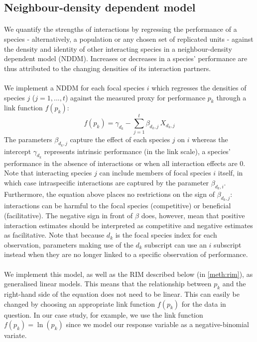 \documentclass[a4,12pt]{article}
\begin{document}
    \subsection{Neighbour-density dependent model}
    \label{meth:nddm}    

        \paragraph{}
        We quantify the strengths of interactions by regressing the performance of a species  - alternatively, a population or any chosen set of replicated units - against the density and identity of other interacting species in a neighbour-density dependent model (NDDM).  Increases or decreases in a species' performance are thus attributed to the changing densities of its interaction partners. 

        \paragraph{}
        We implement a NDDM for each focal species $i$ which regresses the densities of species $j$ ($j = 1, ..., t$) against the measured proxy for performance $p_{k}$ through a link function $f(p_k)$:
        \begin{equation}
        f(p_{k}) = \gamma_{d_k} - \sum_{j=1}^{t} \beta_{d_k,j} \, X_{d_k,j}
        \label{nddm}
        \end{equation}
        The parameters $\beta_{d_k,j}$ capture the effect of each species $j$ on $i$ whereas the intercept $\gamma_{d_k}$ represents intrinsic performance (in the link scale), a species' performance in the absence of interactions or when all interaction effects are $0$. Note that interacting species $j$ can include members of focal species $i$ itself, in which case intraspecific interactions are captured by the parameter $\beta_{d_k,i}$. Furthermore, the equation above places no restrictions on the sign of $\beta_{d_k, j}$: interactions can be harmful to the focal species (competitive) or beneficial (facilitative). The negative sign in front of $\beta$ does, however, mean that positive interaction estimates should be interpreted as competitive and negative estimates as facilitative. Note that because $d_k$ is the focal species index for each observation, parameters making use of the $d_k$ subscript can use an $i$ subscript instead when they are no longer linked to a specific observation of performance.

        \paragraph{}
        We implement this model, as well as the RIM described below (in \ref{meth:rim}), as generalised linear models. This means that the relationship between $p_k$ and the right-hand side of the equation does not need to be linear. This can easily be changed by choosing an appropriate link function $f(p_k)$ for the data in question. In our case study, for example, we use the link function $f(p_k) = \ln(p_k)$ since we model our response variable as a negative-binomial variate.
              
\end{document}
